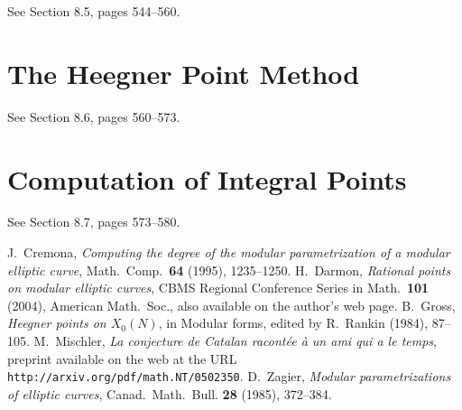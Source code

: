 \documentclass[12pt,a4paper]{article}
\begin{document}
See Section 8.5, pages 544--560.

\section{The Heegner Point Method}

See Section 8.6, pages 560--573.

\section{Computation of Integral Points}

See Section 8.7, pages 573--580.

\bigskip

\begin{thebibliography}{14}
 J.~Cremona, {\it Computing the degree of the modular
parametrization of a modular elliptic curve\/}, Math.~Comp.~{\bf 64} (1995), 
1235--1250.
 H.~Darmon, {\it Rational points on modular elliptic curves\/}, 
CBMS Regional Conference Series in Math.~{\bf 101} (2004), American Math.~Soc.,
also available on the author's web page.
 B.~Gross, {\it Heegner points on $X_0(N)$\/}, in Modular forms,
edited by R.~Rankin (1984), 87--105.
 M.~Mischler, {\it La conjecture de Catalan racont\'ee \`a
un ami qui a le temps\/}, preprint available on the web at the URL
{\tt http://arxiv.org/pdf/math.NT/0502350}.
 D.~Zagier, {\it Modular parametrizations of elliptic curves\/},
Canad.~Math.~Bull. {\bf 28} (1985), 372--384.
\end{thebibliography}


\enddocument
\end{document}
